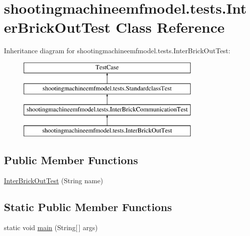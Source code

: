 \hypertarget{classshootingmachineemfmodel_1_1tests_1_1_inter_brick_out_test}{\section{shootingmachineemfmodel.\-tests.\-Inter\-Brick\-Out\-Test Class Reference}
\label{classshootingmachineemfmodel_1_1tests_1_1_inter_brick_out_test}
}
Inheritance diagram for shootingmachineemfmodel.\-tests.\-Inter\-Brick\-Out\-Test\-:\begin{figure}[H]
\begin{center}
\leavevmode
\includegraphics[height=4.000000cm]{classshootingmachineemfmodel_1_1tests_1_1_inter_brick_out_test}
\end{center}
\end{figure}
\subsection*{Public Member Functions}
\begin{DoxyCompactItemize}
\item 
\hyperlink{classshootingmachineemfmodel_1_1tests_1_1_inter_brick_out_test_a60d41fce16d022286bfac441e36b97e2}{Inter\-Brick\-Out\-Test} (String name)
\end{DoxyCompactItemize}
\subsection*{Static Public Member Functions}
\begin{DoxyCompactItemize}
\item 
static void \hyperlink{classshootingmachineemfmodel_1_1tests_1_1_inter_brick_out_test_a57dc5d5ce6cf4b46623bd47f9711fcad}{main} (String\mbox{[}$\,$\mbox{]} args)
\end{DoxyCompactItemize}
